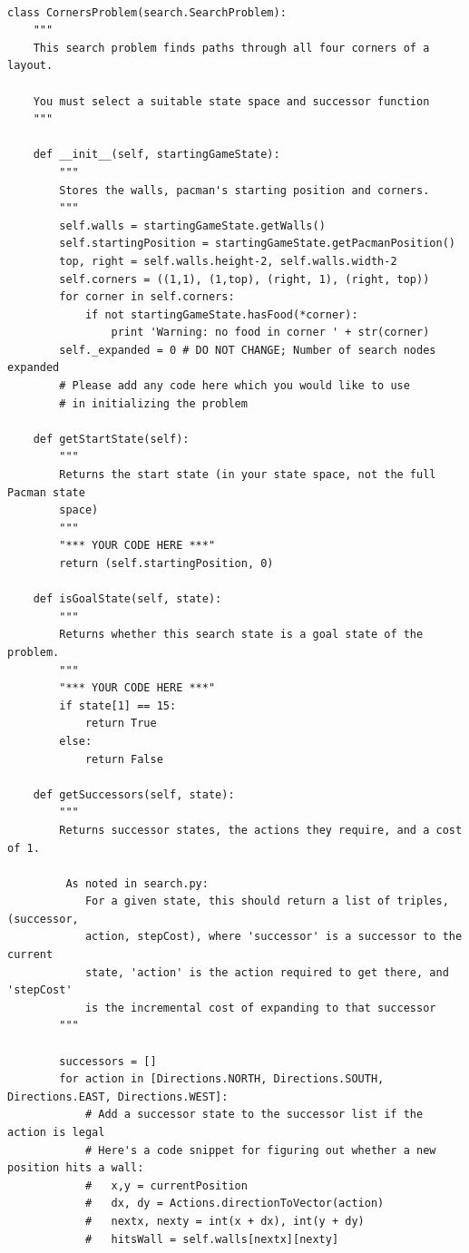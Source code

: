 \documentclass[forprint]{WHUBachelor}
\begin{document}
\begin{verbatim}

class CornersProblem(search.SearchProblem):
    """
    This search problem finds paths through all four corners of a layout.

    You must select a suitable state space and successor function
    """

    def __init__(self, startingGameState):
        """
        Stores the walls, pacman's starting position and corners.
        """
        self.walls = startingGameState.getWalls()
        self.startingPosition = startingGameState.getPacmanPosition()
        top, right = self.walls.height-2, self.walls.width-2
        self.corners = ((1,1), (1,top), (right, 1), (right, top))
        for corner in self.corners:
            if not startingGameState.hasFood(*corner):
                print 'Warning: no food in corner ' + str(corner)
        self._expanded = 0 # DO NOT CHANGE; Number of search nodes expanded
        # Please add any code here which you would like to use
        # in initializing the problem

    def getStartState(self):
        """
        Returns the start state (in your state space, not the full Pacman state
        space)
        """
        "*** YOUR CODE HERE ***"
        return (self.startingPosition, 0)

    def isGoalState(self, state):
        """
        Returns whether this search state is a goal state of the problem.
        """
        "*** YOUR CODE HERE ***"
        if state[1] == 15:
            return True
        else:
            return False

    def getSuccessors(self, state):
        """
        Returns successor states, the actions they require, and a cost of 1.

         As noted in search.py:
            For a given state, this should return a list of triples, (successor,
            action, stepCost), where 'successor' is a successor to the current
            state, 'action' is the action required to get there, and 'stepCost'
            is the incremental cost of expanding to that successor
        """

        successors = []
        for action in [Directions.NORTH, Directions.SOUTH, Directions.EAST, Directions.WEST]:
            # Add a successor state to the successor list if the action is legal
            # Here's a code snippet for figuring out whether a new position hits a wall:
            #   x,y = currentPosition
            #   dx, dy = Actions.directionToVector(action)
            #   nextx, nexty = int(x + dx), int(y + dy)
            #   hitsWall = self.walls[nextx][nexty]


\end{verbatim}
\end{document}
